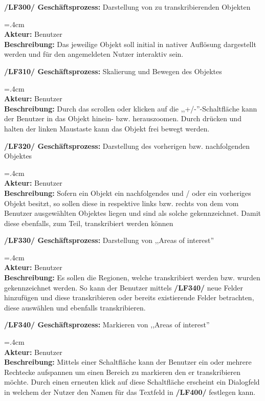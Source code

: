 \documentclass{article}
\newenvironment{funcD}{\vspace{-.6cm}\\\par\begingroup\leftskip=.4cm\noindent\\}{\\\par\endgroup\noindent}
\begin{document}
\textbf{/LF300/ Geschäftsprozess:} Darstellung von zu transkribierenden Objekten
\begin{funcD}
    \textbf{Akteur:} Benutzer\vspace{.1cm}\\
    \textbf{Beschreibung:} Das jeweilige Objekt soll initial in nativer Auflösung dargestellt werden und für den angemeldeten Nutzer interaktiv sein.
\end{funcD}
\textbf{/LF310/ Geschäftsprozess:} Skalierung und Bewegen des Objektes
\begin{funcD}
    \textbf{Akteur:} Benutzer\vspace{.1cm}\\
    \textbf{Beschreibung:} Durch das scrollen oder klicken auf die ,,+/-''-Schaltfläche kann der Benutzer in das Objekt hinein- bzw. herauszoomen. Durch drücken und halten der linken Maustaste kann das Objekt frei bewegt werden. 
\end{funcD}
\textbf{/LF320/ Geschäftsprozess:} Darstellung des vorherigen bzw. nachfolgenden Objektes
\begin{funcD}
    \textbf{Akteur:} Benutzer\vspace{.1cm}\\
    \textbf{Beschreibung:} Sofern ein Objekt ein nachfolgendes und / oder ein vorheriges Objekt besitzt, so sollen diese in respektive links bzw. rechts von dem vom Benutzer ausgewählten Objektes liegen und sind als solche gekennzeichnet. Damit diese ebenfalls, zum Teil, transkribiert werden können
\end{funcD}
\textbf{/LF330/ Geschäftsprozess:} Darstellung von ,,Areas of interest''
\begin{funcD}
    \textbf{Akteur:} Benutzer\vspace{.1cm}\\
    \textbf{Beschreibung:} Es sollen die Regionen, welche transkribiert werden bzw. wurden gekennzeichnet werden. So kann der Benutzer mittels \textbf{/LF340/} neue Felder hinzufügen und diese transkribieren oder bereits existierende Felder betrachten, diese auswählen und ebenfalls transkribieren.  
\end{funcD}
\textbf{/LF340/ Geschäftsprozess:} Markieren von ,,Areas of interest''
\begin{funcD}
    \textbf{Akteur:} Benutzer\vspace{.1cm}\\
    \textbf{Beschreibung:} Mittels einer Schaltfläche kann der Benutzer ein oder mehrere Rechtecke aufspannen um einen Bereich zu markieren den er transkribieren möchte. Durch einen erneuten klick auf diese Schaltfläche erscheint ein Dialogfeld in welchem der Nutzer den Namen für das Textfeld in \textbf{/LF400/} festlegen kann.
\end{funcD}
\end{document}

